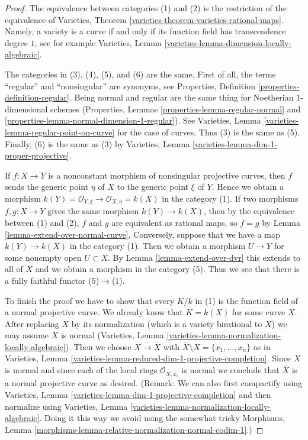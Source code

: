 \documentclass[10pt,a4paper]{amsart}
\theoremstyle{plain}
\theoremstyle{definition}
\theoremstyle{remark}
\numberwithin{equation}{subsection}
\begin{document}
\begin{proof}
The equivalence between categories (1) and (2) is the restriction of the
equivalence of
Varieties, Theorem \ref{varieties-theorem-varieties-rational-maps}.
Namely, a variety is a curve if and only if its function field has
transcendence degree $1$, see for example
Varieties, Lemma \ref{varieties-lemma-dimension-locally-algebraic}.

\medskip\noindent
The categories in (3), (4), (5), and (6) are the same. First of all, the
terms ``regular'' and ``nonsingular'' are synonyms, see
Properties, Definition \ref{properties-definition-regular}.
Being normal and regular are the same thing for Noetherian
$1$-dimensional schemes
(Properties, Lemmas \ref{properties-lemma-regular-normal} and
\ref{properties-lemma-normal-dimension-1-regular}). See
Varieties, Lemma \ref{varieties-lemma-regular-point-on-curve}
for the case of curves. Thus (3) is the same as (5). Finally, (6)
is the same as (3) by
Varieties, Lemma \ref{varieties-lemma-dim-1-proper-projective}.

\medskip\noindent
If $f : X \to Y$ is a nonconstant morphism of nonsingular projective curves,
then $f$ sends the generic point $\eta$ of $X$ to the generic point $\xi$ of
$Y$. Hence we obtain a morphism
$k(Y) = \mathcal{O}_{Y, \xi} \to \mathcal{O}_{X, \eta} = k(X)$
in the category (1). If two morphisms $f,g: X \to Y$ gives the same morphism
$k(Y) \to k(X)$, then by the equivalence between (1) and (2),
$f$ and $g$ are equivalent as rational maps, so $f=g$ by
Lemma \ref{lemma-extend-over-normal-curve}.
Conversely, suppose that we have a map
$k(Y) \to k(X)$ in the category (1). Then we obtain a morphism $U \to Y$
for some nonempty open $U \subset X$. By Lemma \ref{lemma-extend-over-dvr}
this extends to all of $X$ and we obtain a morphism in the category (5).
Thus we see that there is a fully faithful functor (5)$\to$(1).

\medskip\noindent
To finish the proof we have to show that every $K/k$ in (1)
is the function field of a normal projective curve.
We already know that $K = k(X)$ for some curve $X$.
After replacing $X$ by its normalization
(which is a variety birational to $X$)
we may assume $X$ is normal
(Varieties, Lemma \ref{varieties-lemma-normalization-locally-algebraic}).
Then we choose $X \to \overline{X}$ with
$\overline{X} \setminus X = \{x_1, \ldots, x_n\}$ as in
Varieties, Lemma \ref{varieties-lemma-reduced-dim-1-projective-completion}.
Since $X$ is normal and since each
of the local rings $\mathcal{O}_{\overline{X}, x_i}$ is normal
we conclude that $\overline{X}$ is a normal projective curve as desired.
(Remark: We can also first compactify using
Varieties, Lemma \ref{varieties-lemma-dim-1-projective-completion}
and then normalize using
Varieties, Lemma \ref{varieties-lemma-normalization-locally-algebraic}.
Doing it this way we avoid using the somewhat tricky
Morphisms, Lemma \ref{morphisms-lemma-relative-normalization-normal-codim-1}.)
\end{proof}
\end{document}
